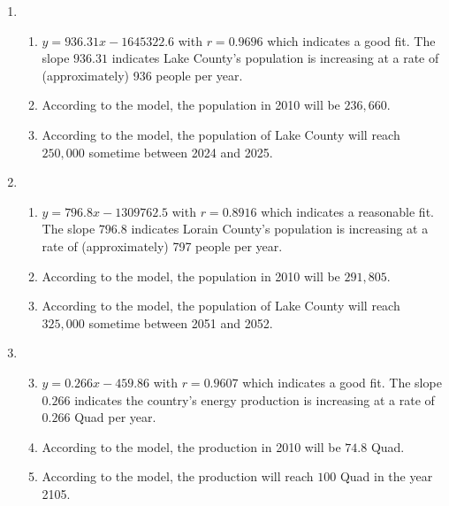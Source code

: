\begin{enumerate}

\item  \begin{enumerate}
 

\item  $y = 936.31x - 1645322.6$ with $r=0.9696$ which indicates a good fit.  The slope $936.31$ indicates Lake County's population is increasing at a rate of (approximately) 936 people per year. 

\item  According to the model, the population in 2010 will be $236, \!660$.

\item  According to the model, the population of Lake County will reach $250,\!000$ sometime between 2024 and 2025.

\end{enumerate}

\item  \begin{enumerate}
 

\item  $y = 796.8x - 1309762.5$ with $r=0.8916$ which indicates a reasonable fit.  The slope $796.8$ indicates Lorain County's population is increasing at a rate of (approximately) 797 people per year. 

\item  According to the model, the population in 2010 will be $291, \! 805$.

\item  According to the model, the population of Lake County will reach $325,\!000$ sometime between 2051 and 2052.

\end{enumerate}

\item \begin{enumerate}

\setcounter{enumii}{2}

\item $y = 0.266x - 459.86$ with $r = 0.9607$ which indicates a good fit.  The slope $0.266$ indicates the country's energy production is increasing at a rate of $0.266$ Quad per year.

\item According to the model, the production in 2010 will be $74.8$ Quad.

\item According to the model, the production will reach $100$ Quad in the year 2105.


\end{enumerate}
\end{enumerate}
